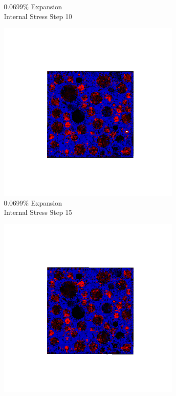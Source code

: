 \begin{figure}[ht!]
\begin{subfigure}{.25\textwidth}
      \caption{0.0699\% Expansion\\Internal Stress Step 10}
    \end{subfigure}%
    \begin{subfigure}{.25\textwidth}
      \centering
      \includegraphics[width=1.0\linewidth]{Files/exp_3D/ASR/A30P75_1_s15.png}
      \caption{0.0699\% Expansion\\Internal Stress Step 15}
    \end{subfigure}%
    \begin{subfigure}{.25\textwidth}
      \centering
      \includegraphics[width=1.0\linewidth]{Files/exp_3D/ASR/A30P75_1_stress.png}

\end{subfigure}
\end{figure}
